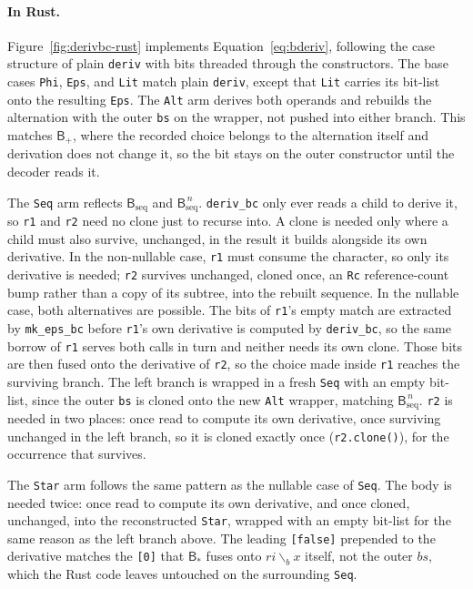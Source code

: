 %

\paragraph{In Rust.}
\label{sec:deriv-bc-impl}

Figure~\ref{fig:derivbc-rust} implements Equation~\eqref{eq:bderiv}, 
following the case structure of plain \texttt{deriv} 
with bits threaded through the constructors. 
The base cases \texttt{Phi}, \texttt{Eps}, and \texttt{Lit} match plain \texttt{deriv}, 
except that \texttt{Lit} carries its bit-list onto the resulting \texttt{Eps}.
The \texttt{Alt} arm derives both operands and rebuilds the alternation
with the outer \texttt{bs} on the wrapper, not pushed into either branch.
This matches $\mathsf{B}_{+}$, 
where the recorded choice belongs to the alternation itself 
and derivation does not change it, 
so the bit stays on the outer constructor until the decoder reads it.

The \texttt{Seq} arm reflects $\mathsf{B}_{\mathrm{seq}}$
and $\mathsf{B}_{\mathrm{seq}}^{\,n}$.
\texttt{deriv\_bc} only ever reads a child to derive it,
so \texttt{r1} and \texttt{r2} need no clone just to recurse into.
A clone is needed only where a child must also survive, unchanged,
in the result it builds alongside its own derivative.
In the non-nullable case, \texttt{r1} must consume the character,
so only its derivative is needed;
\texttt{r2} survives unchanged, cloned once, an \texttt{Rc}
reference-count bump rather than a copy of its subtree,
into the rebuilt sequence.
In the nullable case, both alternatives are possible.
The bits of \texttt{r1}'s empty match are extracted
by \texttt{mk\_eps\_bc} before \texttt{r1}'s own derivative
is computed by \texttt{deriv\_bc}, so the same borrow of \texttt{r1}
serves both calls in turn and neither needs its own clone.
Those bits are then fused onto the derivative of \texttt{r2},
so the choice made inside \texttt{r1} reaches the surviving branch.
The left branch is wrapped in a fresh \texttt{Seq} with an empty bit-list,
since the outer \texttt{bs} is cloned onto the new \texttt{Alt} wrapper,
matching $\mathsf{B}_{\mathrm{seq}}^{\,n}$. \texttt{r2} is needed in two places:
once read to compute its own derivative,
once surviving unchanged in the left branch,
so it is cloned exactly once (\texttt{r2.clone()}),
for the occurrence that survives.

The \texttt{Star} arm follows the same pattern as the nullable case of \texttt{Seq}.
The body is needed twice:
once read to compute its own derivative, and
once cloned, unchanged, into the reconstructed \texttt{Star},
wrapped with an empty bit-list for the same reason as the left branch above.
The leading \texttt{[false]} prepended to the derivative 
matches the \texttt{[0]} that $\mathsf{B}_{*}$ 
fuses onto $\mathit{ri}\backslash_b x$ itself, 
not the outer $bs$, which the Rust code leaves untouched on the surrounding \texttt{Seq}.


